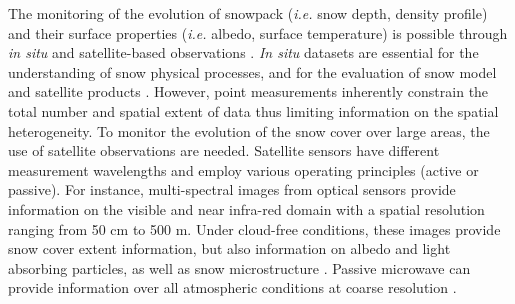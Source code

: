 \documentclass[utf8]{frontiersSCNS} %
\begin{document}
The monitoring of the evolution of snowpack (\textit{i.e.} snow depth, density profile) and their surface properties (\textit{i.e.} albedo, surface temperature) is possible through \textit{in situ} \citep{Essery_2013,Lejeune_2018,Menard_2019} and satellite-based observations \citep{DeLannoy_2012,Dietz_2012,Gascoin_2015}. \textit{In situ} datasets are essential for the understanding of snow physical processes, and for the evaluation of snow model and satellite products \citep{Vionnet_2012,Krinner_2018}. However, point measurements inherently constrain the total number and spatial extent of data thus limiting information on the spatial heterogeneity. To monitor the evolution of the snow cover over large areas, the use of satellite observations are needed. Satellite sensors have different measurement wavelengths and employ various operating principles (active or passive). For instance, multi-spectral images from optical sensors provide information on the visible and near infra-red domain with a spatial resolution ranging from 50 cm to 500 m. Under cloud-free conditions, these images provide snow cover extent information, but also information on albedo and light absorbing particles, as well as snow microstructure \citep{Hall_1995,Hall_2007,Dietz_2012,Gascoin_2015}. Passive microwave can provide information over all atmospheric conditions at coarse resolution \citep{DeLannoy_2012}.


\end{document}
